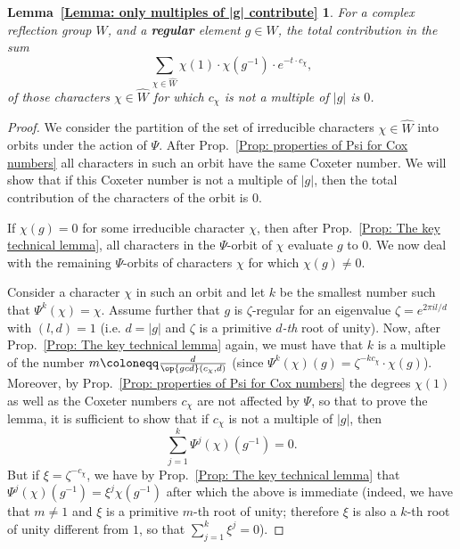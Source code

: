 \newtheorem*{Lemma: only multiples of |g| contribute}{Lemma~\ref{Lemma: only multiples of |g| contribute}}
\begin{Lemma: only multiples of |g| contribute}
For a complex reflection group $W$, and a \textbf{regular} element $g\in W$, the total contribution in the sum 
\[
\sum_{\chi\in\widehat{W}}\chi(1)\cdot \chi(g^{-1})\cdot e^{-t\cdot c_{\chi}},
\]
of those characters $\chi\in\widehat{W}$ for which $c_{\chi}$ is not a multiple of $|g|$ is $0$.
\end{Lemma: only multiples of |g| contribute}

\begin{proof}
We consider the partition of the set of irreducible characters $\chi\in\widehat{W}$ into orbits under the action of $\Psi$. After Prop.~\ref{Prop: properties of Psi for Cox numbers} all characters in such an orbit have the same Coxeter number. We will show that if this Coxeter number is not a multiple of $|g|$, then the total contribution of the characters of the orbit is $0$. 

If $\chi(g)=0$ for some irreducible character $\chi$, then after Prop.~\ref{Prop: The key technical lemma}, all characters in the $\Psi$-orbit of $\chi$ evaluate $g$ to $0$.  We now deal with the remaining $\Psi$-orbits of characters $\chi$ for which $\chi(g)\neq 0$.

Consider a character $\chi$ in such an orbit and let $k$ be the smallest number such that $\Psi^k(\chi)=\chi$. Assume further that $g$ is $\zeta$-regular for an eigenvalue $\zeta=e^{2\pi il/d}$ with $(l,d)=1$ (i.e. $d=|g|$ and $\zeta$ is a primitive \emph{$d$-th} root of unity). Now, after Prop.~\ref{Prop: The key technical lemma} again, we must have that $k$ is a multiple of the number $m\coloneqq \frac{d}{\op{gcd}(c_{\chi},d)}$ (since $\Psi^k(\chi)(g)=\zeta^{-kc_{\chi}}\cdot\chi(g)$). Moreover, by Prop.~\ref{Prop: properties of Psi for Cox numbers} the degrees $\chi(1)$ as well as the Coxeter numbers $c_{\chi}$ are not affected by $\Psi$, so that to prove the lemma, it is sufficient to show that if $c_{\chi}$ is not a multiple of $|g|$, then $$\sum_{j=1}^k\Psi^j(\chi)(g^{-1})=0.$$ But if $\xi=\zeta^{-c_{\chi}}$, we have by Prop.~\ref{Prop: The key technical lemma} that $\Psi^j(\chi)(g^{-1})=\xi^j\chi(g^{-1})$ after which the above is immediate (indeed, we have that $m\neq 1$ and $\xi$ is a primitive $m$-th root of unity; therefore $\xi$ is
 also a $k$-th root of unity different from $1$, so that $\sum_{j=1}^k\xi^j=0$).
\end{proof}


